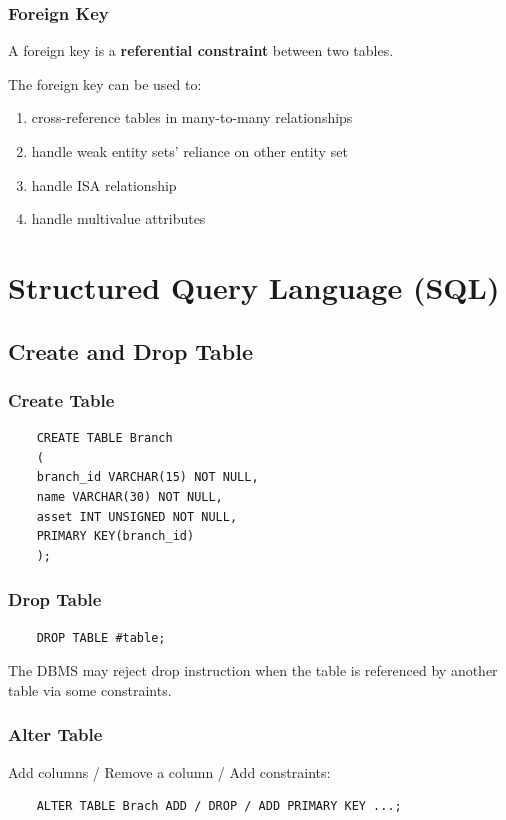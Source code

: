 \documentclass[11pt,a4paper]{article}
\begin{document}
\subsubsection{Foreign Key}
A foreign key is a \textbf{referential constraint} between two tables. \par
The foreign key can be used to:

\begin{enumerate}
    \item [1.] cross-reference tables in many-to-many relationships
    \item [2.] handle weak entity sets' reliance on other entity set
    \item [3.] handle ISA relationship
    \item [4.] handle multivalue attributes
\end{enumerate}

\section{Structured Query Language (SQL)}
\subsection{Create and Drop Table}
\subsubsection{Create Table}
\begin{lstlisting}
    CREATE TABLE Branch
    (
    branch_id VARCHAR(15) NOT NULL,
    name VARCHAR(30) NOT NULL,
    asset INT UNSIGNED NOT NULL,
    PRIMARY KEY(branch_id)
    );
\end{lstlisting}

\subsubsection{Drop Table}
\begin{lstlisting}
    DROP TABLE #table;
\end{lstlisting}
The DBMS may reject drop instruction when the table is referenced by another table via some constraints. \par

\subsubsection{Alter Table}
Add columns / Remove a column / Add constraints:
\begin{lstlisting}
    ALTER TABLE Brach ADD / DROP / ADD PRIMARY KEY ...;
\end{lstlisting}
\end{document}

